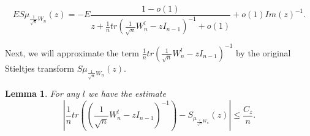 \documentclass[12pt,a4paper,leqno]{report}
\theoremstyle{plain}
\newtheorem{lem}[equation]{Lemma}
\theoremstyle{definition}
\theoremstyle{remark}
\begin{document}
\begin{equation*}
ES\mu_{\frac{1}{\sqrt{n}}W_n}(z) = -E\frac{1-o(1)}{z+\frac{1}{n}tr(\frac{1}{\sqrt{n}}W_n^l-zI_{n-1})^{-1} + o(1)} + o(1)Im(z)^{-1}.
\end{equation*}

Next, we will approximate the term $\frac{1}{n}tr(\frac{1}{\sqrt{n}}W_n^l-zI_{n-1})^{-1}$ by the original Stieltjes transform $S\mu_{\frac{1}{\sqrt{n}}W_n}(z)$.

\begin{lem} \label{est5}
For any $l$ we have the estimate
\begin{equation*}
|\frac{1}{n}tr((\frac{1}{\sqrt{n}}W_n^l-zI_{n-1})^{-1}) - S_{\mu_{\frac{1}{\sqrt{n}}W_n}}(z)| \leq \frac{C_z}{n}.
\end{equation*}
\end{lem}
\end{document}
